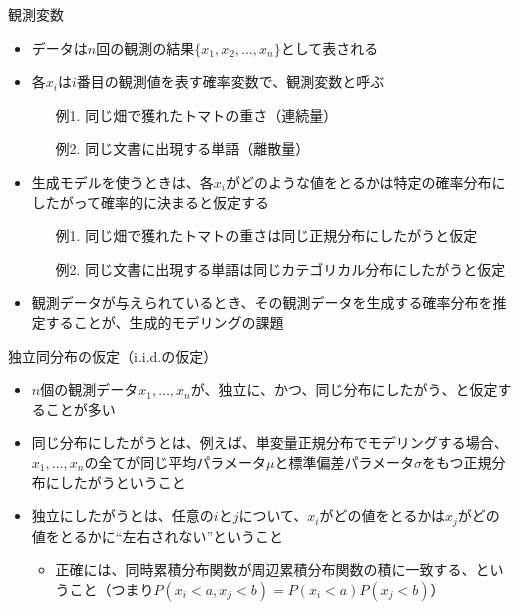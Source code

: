 \documentclass[aspectratio=169,unicode,dvipdfmx,14pt]{beamer}
\begin{document}
\begin{frame}{観測変数}
\begin{itemize}
\item データは$n$回の観測の結果$\{x_1,x_2,\ldots,x_n\}$として表される
\item 各$x_i$は$i$番目の観測値を表す確率変数で、観測変数と呼ぶ
\begin{itemize}
\item[例1.] 同じ畑で獲れたトマトの重さ（連続量）
\item[例2.] 同じ文書に出現する単語（離散量）
\end{itemize}
\item 生成モデルを使うときは、各$x_i$がどのような値をとるかは特定の確率分布にしたがって確率的に決まると仮定する
\begin{itemize}
\item[例1.] 同じ畑で獲れたトマトの重さは同じ正規分布にしたがうと仮定
\item[例2.] 同じ文書に出現する単語は同じカテゴリカル分布にしたがうと仮定
\end{itemize}
\item 観測データが与えられているとき、その観測データを生成する確率分布を推定することが、生成的モデリングの課題
\end{itemize}
\end{frame}

\begin{frame}{独立同分布の仮定（i.i.d.の仮定）}
\begin{itemize}
\item $n$個の観測データ$x_1,\ldots,x_n$が、独立に、かつ、同じ分布にしたがう、と仮定することが多い
\item 同じ分布にしたがうとは、例えば、単変量正規分布でモデリングする場合、$x_1,\ldots,x_n$の全てが同じ平均パラメータ$\mu$と標準偏差パラメータ$\sigma$をもつ正規分布にしたがうということ
\item 独立にしたがうとは、任意の$i$と$j$について、$x_i$がどの値をとるかは$x_j$がどの値をとるかに``左右されない''ということ
\begin{itemize}
\item 正確には、同時累積分布関数が周辺累積分布関数の積に一致する、ということ（つまり$P(x_i<a,x_j<b)=P(x_i<a)P(x_j<b)$）
\end{itemize}
\end{itemize}
\end{frame}
\end{document}
